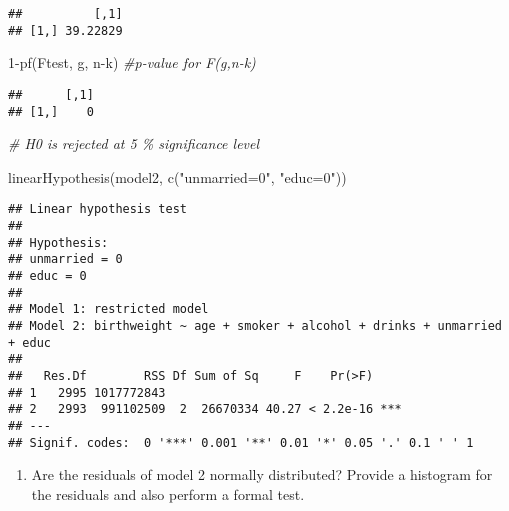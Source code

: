 \documentclass[
]{article}
\newenvironment{Shaded}{\begin{snugshade}}{\end{snugshade}}
\newcommand{\CommentTok}[1]{\textcolor[rgb]{0.56,0.35,0.01}{\textit{#1}}}
\newcommand{\DecValTok}[1]{\textcolor[rgb]{0.00,0.00,0.81}{#1}}
\newcommand{\FunctionTok}[1]{\textcolor[rgb]{0.00,0.00,0.00}{#1}}
\newcommand{\NormalTok}[1]{#1}
\newcommand{\SpecialCharTok}[1]{\textcolor[rgb]{0.00,0.00,0.00}{#1}}
\newcommand{\StringTok}[1]{\textcolor[rgb]{0.31,0.60,0.02}{#1}}
\providecommand{\tightlist}{%
  \setlength{\itemsep}{0pt}\setlength{\parskip}{0pt}}
\begin{document}
\begin{verbatim}
##          [,1]
## [1,] 39.22829
\end{verbatim}

\begin{Shaded}
\begin{Highlighting}[]
\DecValTok{1}\SpecialCharTok{{-}}\FunctionTok{pf}\NormalTok{(Ftest, g, n}\SpecialCharTok{{-}}\NormalTok{k) }\CommentTok{\#p{-}value for F(g,n{-}k)}
\end{Highlighting}
\end{Shaded}

\begin{verbatim}
##      [,1]
## [1,]    0
\end{verbatim}

\begin{Shaded}
\begin{Highlighting}[]
\CommentTok{\# H0 is rejected at 5 \% significance level}
\end{Highlighting}
\end{Shaded}

\normalsize

\small

\begin{Shaded}
\begin{Highlighting}[]
\FunctionTok{linearHypothesis}\NormalTok{(model2, }\FunctionTok{c}\NormalTok{(}\StringTok{"unmarried=0"}\NormalTok{, }\StringTok{"educ=0"}\NormalTok{))}
\end{Highlighting}
\end{Shaded}

\begin{verbatim}
## Linear hypothesis test
## 
## Hypothesis:
## unmarried = 0
## educ = 0
## 
## Model 1: restricted model
## Model 2: birthweight ~ age + smoker + alcohol + drinks + unmarried + educ
## 
##   Res.Df        RSS Df Sum of Sq     F    Pr(>F)    
## 1   2995 1017772843                                 
## 2   2993  991102509  2  26670334 40.27 < 2.2e-16 ***
## ---
## Signif. codes:  0 '***' 0.001 '**' 0.01 '*' 0.05 '.' 0.1 ' ' 1
\end{verbatim}

\normalsize

\begin{enumerate}
\def\labelenumi{\alph{enumi}.}
\setcounter{enumi}{2}
\tightlist
\item
  Are the residuals of model 2 normally distributed? Provide a histogram
  for the residuals and also perform a formal test.
\end{enumerate}
\end{document}
